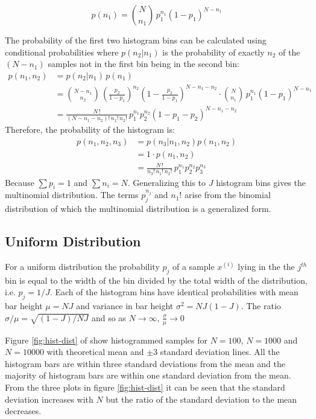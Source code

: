\documentclass[12pt]{article}
\begin{document}
\begin{equation}
	p(n_1) = \binom {N} {n_1} \, p_1^{n_1} (1-p_1)^{N - n_1}
\end{equation}

The probability of the first two histogram bins can be calculated using conditional probabilities where $p(n_2|n_1)$ is the probability of exactly $n_2$ of the $(N-n_1)$ samples not in the first bin being in the second bin:
\begin{align}
	p(n_1, n_2) &= p(n_2 | n_1) \, p(n_1) \nonumber \\
    			&= \binom {N {-} n_1}{n_2} \, 
                	\left( \frac {p_2} {1 - p_1} \right)^{n_2} 
                	\left( 1 - \frac {p_2} {1-p_1} \right) ^ {N - n_1 - n_2} 
                	\cdot \binom {N}{n_1} \, p_1^{n_1} (1-p_1)^{N - n_1} \nonumber \\
                &= \frac {N\,!} {(N - n_1 - n_2)!\, n_1!\, n_2!} \,
                	p_1^{n_1} p_2^{n_2} (1 - p_1 - p_2)^{N - n_1 - n_2}
\end{align}
Therefore, the probability of the histogram is:
\begin{align}
	p(n_1, n_2, n_3) &= p(n_3 | n_1, n_2) p(n_1, n_2) \nonumber \\
                     &= 1 \cdot p(n_1, n_2) \nonumber \\
                     &= \frac {N\,!} {n_3!\, n_1!\, n_2!} \, p_1^{n_1} p_2^{n_2} p_3^{n_3}
\end{align}
Because $\sum p_i = 1$ and $\sum n_i = N$. Generalizing this to $J$ histogram bins gives the multinomial distribution. The terms $p_j^{n_j}$ and $n_1!$ arise from the binomial distribution of which the multinomial distribution is a generalized form. 

\subsection{Uniform Distribution}

For a uniform distribution the probability $p_j$ of a sample  $x^{(i)}$ lying in the the $j^{th}$ bin is equal to the width of the bin divided by the total width of the distribution, i.e.  $p_j = 1/J$. Each of the histogram bins have identical probabilities with mean bar height  $\mu = NJ$ and variance in bar height $\sigma^2 = NJ(1-J)$. The ratio $\sigma / \mu = \sqrt {(1-J) / NJ}$ and so as $N \to \infty$, $\frac \sigma \mu \to 0$

Figure \ref{fig:hist-dist} of show histogrammed samples for $N=100$,  $N=1000$ and $N=10000$ with theoretical mean and $\pm 3$ standard deviation lines. All the histogram bars are within three standard deviations from the mean and the majority of histogram bars are within one standard deviation from the mean. From the three plots in figure \ref{fig:hist-dist} it can be seen that the standard deviation increases with $N$ but the ratio of the standard deviation to the mean decreases.
\end{document}
